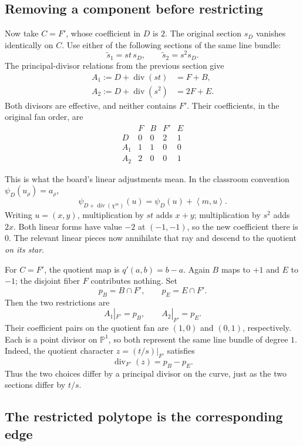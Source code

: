 \documentclass[11pt]{article}
\theoremstyle{definition}
\theoremstyle{remark}
\DeclareMathOperator{\divisor}{div}
\newcommand{\braket}[2]{\left\langle #1,#2\right\rangle}
\newcommand{\bP}{\mathbb{P}}
\begin{document}
\subsection{Removing a component before restricting}

Now take \(C=F'\), whose coefficient in \(D\) is \(2\).
The original section \(s_D\) vanishes identically on \(C\).
Use either of the following sections of the same line bundle:
\[
    \widetilde{s}_1=st\,s_D,\qquad
    \widetilde{s}_2=s^2s_D.
\]
The principal-divisor relations from the previous section give
\[
    \begin{aligned}
        A_1:=D+\divisor(st)&=F+B,\\
        A_2:=D+\divisor(s^2)&=2F+E.
    \end{aligned}
\]
Both divisors are effective, and neither contains \(F'\).
Their coefficients, in the original fan order, are
\[
    \begin{array}{c|cccc}
        &F&B&F'&E\\ \hline
        D&0&0&2&1\\
        A_1&1&1&0&0\\
        A_2&2&0&0&1
    \end{array}
\]

This is what the board's linear adjustments mean. In the classroom
convention \(\psi_D(u_\rho)=a_\rho\),
\[
    \psi_{D+\divisor(\chi^m)}(u)
       =\psi_D(u)+\braket{m}{u}.
\]
Writing \(u=(x,y)\), multiplication by \(st\) adds \(x+y\);
multiplication by \(s^2\) adds \(2x\). Both linear forms have value
\(-2\) at \((-1,-1)\), so the new coefficient there is \(0\).
The relevant linear pieces now annihilate that ray and descend to
the quotient \emph{on its star}.

For \(C=F'\), the quotient map is \(q'(a,b)=b-a\).
Again \(B\) maps to \(+1\) and \(E\) to \(-1\); the disjoint fiber
\(F\) contributes nothing. Set
\[
    p_B=B\cap F',\qquad p_E=E\cap F'.
\]
Then the two restrictions are
\[
    A_1|_{F'}=p_B,\qquad A_2|_{F'}=p_E.
\]
Their coefficient pairs on the quotient fan are \((1,0)\) and
\((0,1)\), respectively. Each is a point divisor on \(\bP^1\), so
both represent the same line bundle of degree \(1\).
Indeed, the quotient character \(z=(t/s)|_{F'}\) satisfies
\[
    \divisor_{F'}(z)=p_B-p_E.
\]
Thus the two choices differ by a principal divisor on the curve,
just as the two sections differ by \(t/s\).

\subsection{The restricted polytope is the corresponding edge}
\end{document}
